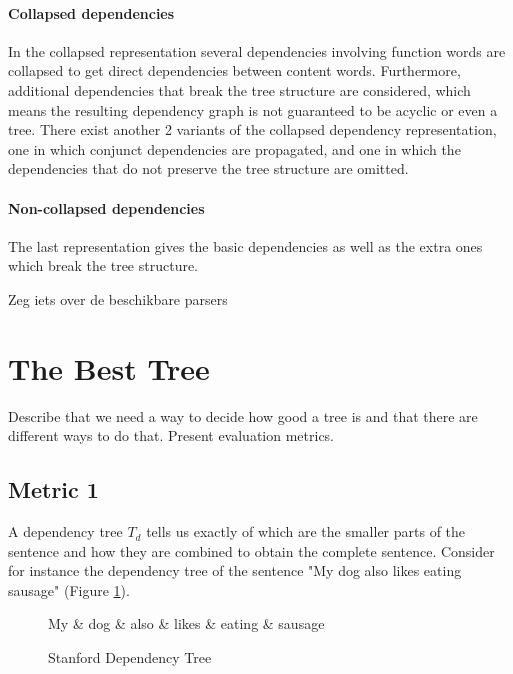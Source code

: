 \documentclass{report}
\theoremstyle{definition}
\theoremstyle{plain}
\begin{document}
\paragraph{Collapsed dependencies} In the collapsed representation several dependencies involving function words are collapsed to get direct dependencies between content words. Furthermore, additional dependencies that break the tree structure are considered, which means the resulting dependency graph is not guaranteed to be acyclic or even a tree. There exist another 2 variants of the collapsed dependency representation, one in which conjunct dependencies are propagated, and one in which the dependencies that do not preserve the tree structure are omitted.
\paragraph{Non-collapsed dependencies} The last representation gives the basic dependencies as well as the extra ones which break the tree structure.

Zeg iets over de beschikbare parsers \cite{de2006generating}

\section{The Best Tree}

Describe that we need a way to decide how good a tree is and that there are different ways to do that. Present evaluation metrics.



\subsection{Metric 1}

A dependency tree $T_d$ tells us exactly of which are the smaller parts of the sentence and how they are combined to obtain the complete sentence. Consider for instance the dependency tree of the sentence "My dog also likes eating sausage" (Figure \ref{fig:deptree1}).

\begin{figure}[!h]\label{fig:deptree1}
\centering
\begin{dependency}[theme=simple]%
\begin{deptext}[column sep=.5cm, row sep=.1ex]
My \& dog \& also \& likes \& eating \& sausage \\
\end{deptext}
\end{dependency}
\caption{Stanford Dependency Tree}
\end{figure}
\end{document}
